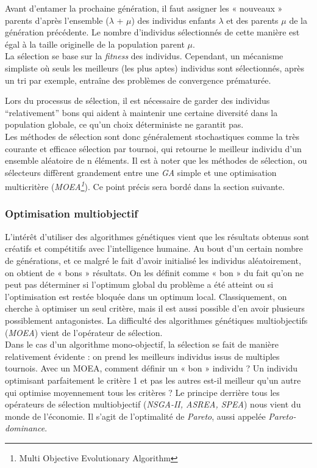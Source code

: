 \documentclass[french, 11pt]{memoir}
\begin{document}
Avant d'entamer la prochaine génération, il faut assigner les « nouveaux
» parents d'après l'ensemble ($\lambda$ + $\mu$) des individus enfants
$\lambda$ et des parents $\mu$ de la génération précédente. Le nombre
d'individus sélectionnés de cette manière est égal à la taille
originelle de la population parent $\mu$. \\
La sélection se base sur la \emph{fitness} des individus. Cependant, un
mécanisme simpliste où seuls les meilleurs (les plus aptes) individus
sont sélectionnés, après un tri par exemple, entraîne des problèmes de
convergence prématurée.

\bigskip
Lors du processus de sélection, il est nécessaire de garder des
individus ``relativement\cite{sharma2010archived,deb2002fast}'' bons qui aident à maintenir une certaine
diversité dans la population globale, ce qu'un choix déterministe ne
garantit pas. \\
Les méthodes de sélection sont donc généralement stochastiques comme la
très courante et efficace sélection par tournoi, qui retourne le
meilleur individu d'un ensemble aléatoire de n éléments. 
Il est à noter que les méthodes de sélection, ou sélecteurs diffèrent
grandement entre une \emph{GA} simple et une optimisation multicritère
(\emph{MOEA\footnote{Multi Objective Evolutionary Algorithm}}). Ce point précis sera bordé dans la section suivante.

\subsubsection{Optimisation
multiobjectif}\label{optimisation-multiobjectif}

L'intérêt d'utiliser des algorithmes génétiques vient que les résultats
obtenus sont créatifs et compétitifs avec l'intelligence humaine. Au
bout d'un certain nombre de générations, et ce malgré le fait d'avoir
initialisé les individus aléatoirement, on obtient de « bons »
résultats. On les définit comme « bon » du fait qu'on ne peut pas
déterminer si l'optimum global du problème a été atteint ou si
l'optimisation est restée bloquée dans un optimum local. Classiquement,
on cherche à optimiser un seul critère, mais il est aussi possible d'en
avoir plusieurs possiblement antagonistes. La difficulté des algorithmes génétiques multiobjectifs (\emph{MOEA}) vient de l'opérateur de
sélection. 
\\ Dans le cas d'un algorithme mono-objectif, la sélection se
fait de manière relativement évidente : on prend les meilleurs individus
issus de multiples tournois. Avec un MOEA, comment définir un « bon »
individu ? Un individu optimisant parfaitement le critère 1 et pas les
autres est-il meilleur qu'un autre qui optimise moyennement tous les
critères ? Le principe derrière tous les opérateurs de sélection
multiobjectif (\emph{NSGA-II\cite{deb2002fast}, ASREA\cite{sharma2010archived,sharma2010gpgpu}, SPEA}) nous vient du monde de
l'économie. Il s'agit de l'optimalité de \emph{Pareto}, aussi appelée
\emph{Pareto-dominance}.
\end{document}
